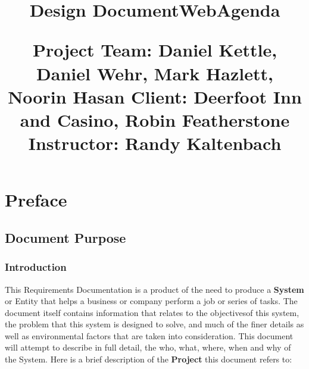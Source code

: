 \documentclass[letterpaper,12pt]{report}
\begin{document}
\title{Design Document\linebreak WebAgenda\linebreak \linebreak 
	\begin{small}\textbf{Project Team:} Daniel Kettle, Daniel Wehr, Mark Hazlett, Noorin Hasan\linebreak
	\textbf{Client:} Deerfoot Inn and Casino, Robin Featherstone\linebreak
	\textbf{Instructor:} Randy Kaltenbach\end{small}}

\author{}
\maketitle
\tableofcontents
\listoffigures

\part{Preface}
\chapter{Document Purpose}
\section{Introduction}
\hspace{1cm}This Requirements Documentation is a product of the need to produce a \textbf{System} or Entity that helps a business or company perform a job or series of tasks. The document itself contains information that relates to the objectives\space of this system, the problem that this system is designed to solve, and much of the finer details as well as environmental factors that are taken into consideration. This document will attempt to describe in full detail, the who, what, where, when and why of the System.
Here is a brief description of the \textbf{Project} this document refers to:
\end{document}
